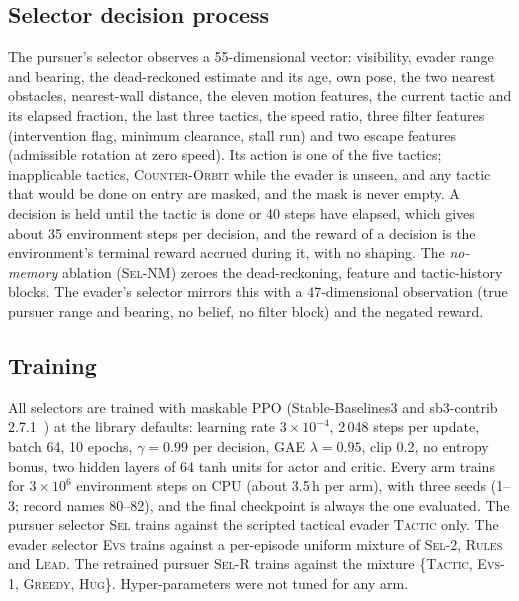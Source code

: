 \documentclass[conference]{IEEEtran}
\newcommand{\pol}[1]{\textsc{#1}}
\begin{document}
\subsection{Selector decision process}
The pursuer's selector observes a 55-dimensional vector: visibility, evader range and bearing, the dead-reckoned estimate and its age, own pose, the two nearest obstacles, nearest-wall distance, the eleven motion features, the current tactic and its elapsed fraction, the last three tactics, the speed ratio, three filter features (intervention flag, minimum clearance, stall run) and two escape features (admissible rotation at zero speed). Its action is one of the five tactics; inapplicable tactics, \pol{Counter-Orbit} while the evader is unseen, and any tactic that would be done on entry are masked, and the mask is never empty. A decision is held until the tactic is done or 40 steps have elapsed, which gives about 35 environment steps per decision, and the reward of a decision is the environment's terminal reward accrued during it, with no shaping. The \emph{no-memory} ablation (\pol{Sel-NM}) zeroes the dead-reckoning, feature and tactic-history blocks. The evader's selector mirrors this with a 47-dimensional observation (true pursuer range and bearing, no belief, no filter block) and the negated reward.

\subsection{Training}
All selectors are trained with maskable PPO (Stable-Baselines3 and sb3-contrib 2.7.1~\cite{raffin2021stable}) at the library defaults: learning rate $3\times10^{-4}$, 2\,048 steps per update, batch 64, 10 epochs, $\gamma=0.99$ per decision, GAE $\lambda=0.95$, clip 0.2, no entropy bonus, two hidden layers of 64 tanh units for actor and critic. Every arm trains for $3\times10^{6}$ environment steps on CPU (about 3.5\,h per arm), with three seeds (1--3; record names 80--82), and the final checkpoint is always the one evaluated. The pursuer selector \pol{Sel} trains against the scripted tactical evader \pol{Tactic} only. The evader selector \pol{Evs} trains against a per-episode uniform mixture of \pol{Sel}-2, \pol{Rules} and \pol{Lead}. The retrained pursuer \pol{Sel-R} trains against the mixture \{\pol{Tactic}, \pol{Evs}-1, \pol{Greedy}, \pol{Hug}\}. Hyper-parameters were not tuned for any arm.
\end{document}
